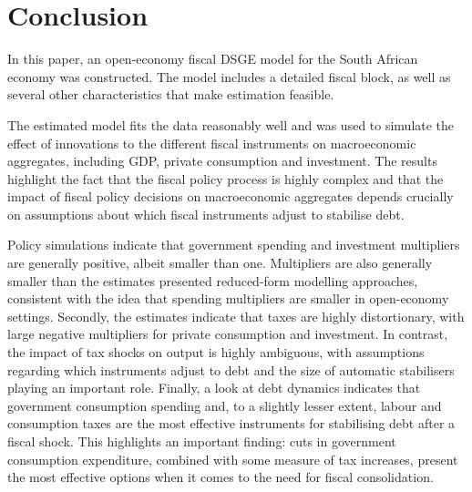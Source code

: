 \documentclass[a4paper,11pt]{article}
\numberwithin{equation}{section}
\begin{document}
	\begin{minipage}{\linewidth}
	\end{minipage}
	
	
	
	\section{Conclusion} \label{con_dsge}
	
	In this paper, an open-economy fiscal DSGE model for the South African economy was constructed. The model includes a detailed fiscal block, as well as several other characteristics that make estimation feasible. 
	
	The estimated model fits the data reasonably well and was used to simulate the effect of innovations to the different fiscal instruments on macroeconomic aggregates, including GDP, private consumption and investment. The results highlight the fact that the fiscal policy process is highly complex and that the impact of fiscal policy decisions on macroeconomic aggregates depends crucially on assumptions about which fiscal instruments adjust to stabilise debt. 
	
	Policy simulations indicate that government spending and investment multipliers are generally positive, albeit smaller than one. Multipliers are also generally smaller than the estimates presented reduced-form modelling approaches, consistent with the idea that spending multipliers are smaller in open-economy settings. Secondly, the estimates indicate that taxes are highly distortionary, with large negative multipliers for private consumption and investment. In contrast, the impact of tax shocks on output is highly ambiguous, with assumptions regarding which instruments adjust to debt and the size of automatic stabilisers playing an important role. Finally, a look at debt dynamics indicates that government consumption spending and, to a slightly lesser extent, labour and consumption taxes are the most effective instruments for stabilising debt after a fiscal shock. This highlights an important finding: cuts in government consumption expenditure, combined with some measure of tax increases, present the most effective options when it comes to the need for fiscal consolidation. 
	
\end{document}
